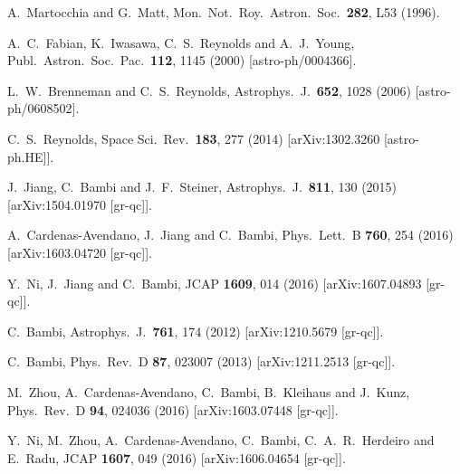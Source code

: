 \documentclass[aps, prd, amsmath, floats, floatfix, twocolumn, nofootinbib, superscriptaddress, showpacs]{revtex4-1}
\begin{document}
\begin{thebibliography}{99}
  A.~Martocchia and G.~Matt,
  Mon.\ Not.\ Roy.\ Astron.\ Soc.\  {\bf 282}, L53 (1996).  
  
  A.~C.~Fabian, K.~Iwasawa, C.~S.~Reynolds and A.~J.~Young,
  Publ.\ Astron.\ Soc.\ Pac.\  {\bf 112}, 1145 (2000)
  [astro-ph/0004366].  
  
  L.~W.~Brenneman and C.~S.~Reynolds,
  Astrophys.\ J.\  {\bf 652}, 1028 (2006)
  [astro-ph/0608502].  
  
  C.~S.~Reynolds,
  Space Sci.\ Rev.\  {\bf 183}, 277 (2014)
  [arXiv:1302.3260 [astro-ph.HE]].    
  
  J.~Jiang, C.~Bambi and J.~F.~Steiner,
  Astrophys.\ J.\  {\bf 811}, 130 (2015)
  [arXiv:1504.01970 [gr-qc]].  
  
  A.~Cardenas-Avendano, J.~Jiang and C.~Bambi,
  Phys.\ Lett.\ B {\bf 760}, 254 (2016)
  [arXiv:1603.04720 [gr-qc]].  
  
  Y.~Ni, J.~Jiang and C.~Bambi,
  JCAP {\bf 1609}, 014 (2016)
  [arXiv:1607.04893 [gr-qc]].  
    
  C.~Bambi,
  Astrophys.\ J.\  {\bf 761}, 174 (2012)
  [arXiv:1210.5679 [gr-qc]].  
  
  C.~Bambi,
  Phys.\ Rev.\ D {\bf 87}, 023007 (2013)
  [arXiv:1211.2513 [gr-qc]].  
  
  M.~Zhou, A.~Cardenas-Avendano, C.~Bambi, B.~Kleihaus and J.~Kunz,
  Phys.\ Rev.\ D {\bf 94}, 024036 (2016)
  [arXiv:1603.07448 [gr-qc]].  
  
  Y.~Ni, M.~Zhou, A.~Cardenas-Avendano, C.~Bambi, C.~A.~R.~Herdeiro and E.~Radu,
  JCAP {\bf 1607}, 049 (2016)
  [arXiv:1606.04654 [gr-qc]].  
  

\end{thebibliography}
\end{document}
